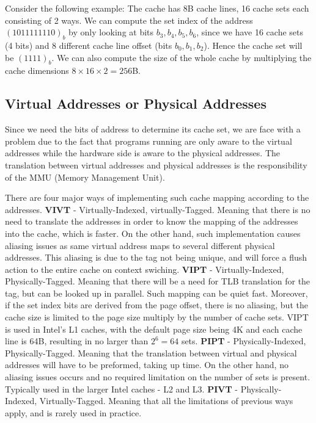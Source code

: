Consider the following example: The cache has 8B cache lines, 16 cache sets each
consisting of 2 ways. We can compute the set index of the address
$(1011111110)_b$ by only looking at bits $b_3, b_4, b_5, b_6$, since we have 16
cache sets (4 bits) and 8 different cache line offset (bits $b_0, b_1, b_2$).
Hence the cache set will be $(1111)_b$. We can also compute the size of the
whole cache by multiplying the cache dimensions $8 \times 16 \times 2 = 256 $B.

\subsection{Virtual Addresses or Physical Addresses}
\label{subsec:addrorphysicaladdr}
Since we need the bits of address to determine its cache set, we are face with a
problem due to the fact that programs running are only aware to the virtual
addresses while the hardware side is aware to the physical addresses. The
translation between virtual addresses and physical addresses is the
responsibility of the MMU (Memory Management Unit).

There are four major ways of implementing such cache mapping according to the
addresses. \textbf{VIVT} - Virtually-Indexed, virtually-Tagged. Meaning that
there is no need to translate the addresses in order to know the mapping of the
addresses into the cache, which is faster. On the other hand, such
implementation causes aliasing issues as same virtual address maps to several
different physical addresses. This aliasing is due to the tag not being unique,
and will force a flush action to the entire cache on context swiching.
\textbf{VIPT} - Virtually-Indexed, Physically-Tagged. Meaning that there will be
a need for TLB translation for the tag, but can be looked up in parallel. Such
mapping can be quiet fast. Moreover, if the set index bits are derived from the
page offset, there is no aliasing, but the cache size is limited to the page
size multiply by the number of cache sets. VIPT is used in Intel's L1 caches,
with the default page size being 4K and each cache line is 64B, resulting in no
larger than $2^6 = 64$ sets. \textbf{PIPT} - Physically-Indexed,
Physically-Tagged. Meaning that the translation between virtual and physical
addresses will have to be preformed, taking up time. On the other hand, no
aliasing issues occurs and no required  limitation on the number of sets is
present. Typically used in the larger Intel caches - L2 and L3. \textbf{PIVT} -
Physically-Indexed, Virtually-Tagged. Meaning that all the limitations of
previous ways apply, and is rarely used in practice. 

